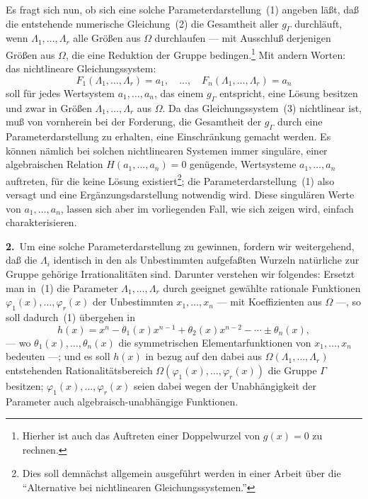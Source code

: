 \documentclass[12pt,a4paper]{article}
\begin{document}
Es fragt sich nun, ob sich eine solche Parameterdarstellung~(1) angeben l\"a\ss t, da\ss{} die entstehende numerische Gleichung~(2) die Gesamtheit aller $g_{\Gamma}$ durchl\"auft, wenn $\Lambda_1, \ldots, \Lambda_r$ alle Gr\"o\ss en aus $\Omega$ durchlaufen --- mit Ausschlu\ss{} derjenigen Gr\"o\ss en aus $\Omega$, die eine Reduktion der Gruppe bedingen.\footnote{Hierher ist auch das Auftreten einer Doppelwurzel von $g(x) = 0$ zu rechnen.} Mit andern Worten: das nichtlineare Gleichungssystem:
\begin{equation}\tag{3}
F_1(\Lambda_1, \ldots, \Lambda_r) = a_1, \quad \ldots, \quad F_n(\Lambda_1, \ldots, \Lambda_r) = a_n
\end{equation}
soll f\"ur jedes Wertsystem $a_1, \ldots, a_n$, das einem $g_{\Gamma}$ entspricht, eine L\"osung besitzen und zwar in Gr\"o\ss en $\Lambda_1, \ldots, \Lambda_r$ aus $\Omega$. Da das Gleichungssystem~(3) nichtlinear ist, mu\ss{} von vornherein bei der Forderung, die Gesamtheit der $g_{\Gamma}$ durch eine Parameterdarstellung zu erhalten, eine Einschr\"ankung gemacht werden. Es k\"onnen n\"amlich bei solchen nichtlinearen Systemen immer singul\"are, einer algebraischen Relation $H(a_1, \ldots, a_n) = 0$ gen\"ugende, Wertsysteme $a_1, \ldots, a_n$ auftreten, f\"ur die keine L\"osung existiert\footnote{Dies soll demn\"achst allgemein ausgef\"uhrt werden in einer Arbeit \"uber die ``Alternative bei nichtlinearen Gleichungssystemen.''}; die Parameterdarstellung~(1) also versagt und eine Erg\"anzungsdarstellung notwendig wird. Diese singul\"aren Werte von $a_1, \ldots, a_n$, lassen sich aber im vorliegenden Fall, wie sich zeigen wird, einfach charakterisieren.

\textbf{2.}\ Um eine solche Parameterdarstellung zu gewinnen, fordern wir weitergehend, da\ss{} die $\Lambda_i$ identisch in den als Unbestimmten aufgefa\ss ten Wurzeln nat\"urliche zur Gruppe geh\"orige Irrationalit\"aten sind. Darunter verstehen wir folgendes: Ersetzt man in~(1) die Parameter $\Lambda_1, \ldots, \Lambda_r$ durch geeignet gew\"ahlte rationale Funktionen $\varphi_1(x), \ldots, \varphi_r(x)$ der Unbestimmten $x_1, \ldots, x_n$ --- mit Koeffizienten aus $\Omega$ ---, so soll dadurch~(1) \"ubergehen in
\begin{equation}\tag{4}
h(x) = x^n - \theta_1(x) x^{n-1} + \theta_2(x) x^{n-2} - \cdots \pm \theta_n(x),
\end{equation}
--- wo $\theta_1(x), \ldots, \theta_n(x)$ die symmetrischen Elementarfunktionen von $x_1, \ldots, x_n$ bedeuten ---; und es soll $h(x)$ in bezug auf den dabei aus $\Omega(\Lambda_1, \ldots, \Lambda_r)$ entstehenden Rationalit\"atsbereich $\Omega(\varphi_1(x), \ldots, \varphi_r(x))$ die Gruppe $\Gamma$ besitzen; $\varphi_1(x), \ldots, \varphi_r(x)$ seien dabei wegen der Unabh\"angigkeit der Parameter auch algebraisch-unabh\"angige Funktionen.
\end{document}

